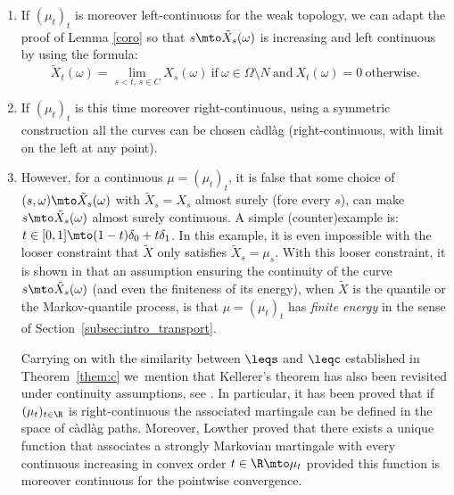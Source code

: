 \skpt
\begin{rem}
\begin{enumerate}
\item
If $(\mu_t)_t$ is moreover left-continuous for the weak topology, we can adapt the proof of Lemma \ref{coro} so that $s\mto \tilde X_s(\omega)$ is increasing and left continuous by using the formula:\vspace*{-3pt}
\[\tilde X_t(\omega)=\lim_{s<t,\,s\in C}X_s(\omega)\ \text{if}\ \omega \in \Omega\setminus N\ \text{and}\ X_t(\omega)=0\ \text{otherwise}.\]

\item
If $(\mu_t)_t$ is this time moreover right-continuous, using a symmetric construction all the curves can be chosen càdlàg (right-continuous, with limit on the left at any point).

\item
However, for a continuous $\mu=(\mu_t)_t$, it is false that some choice of $(s,\omega)\mto \tilde X_s(\omega)$ with $\tilde X_s=X_s$ almost surely (fore every $s$), can make $s\mto \tilde X_s(\omega)$ almost surely continuous. A simple (counter)example is: $t\in [0,1]\mto (1-t)\delta_0+t \delta_1$. In this example, it is even impossible with the looser constraint that $\tilde X$ only satisfies $\tilde X_s=\mu_s$. With this looser constraint, it is shown in \cite{BouJui2} that an assumption ensuring the continuity of the curve $s\mto \tilde X_s(\omega)$ (and even the finiteness of its energy), when $\tilde X$ is the quantile or the Markov-quantile process, is that $\mu=(\mu_t)_t$ has \emph{finite energy} in the sense of Section~\ref{subsec:intro_transport}.

Carrying on with the similarity between $\leqs$ and $\leqc$ established in Theorem~\ref{them:c} we~mention that Kellerer's theorem has also been revisited under continuity assumptions, see \cite{Low,HiRoYo14,BHS}. In particular, it has been proved that if $(\mu_t)_{t\in \R}$ is right-continuous the associated martingale can be defined in the space of càdlàg paths. Moreover, Lowther proved \cite[Th.\,1.5]{Low2} that there exists a unique function that associates a strongly Markovian martingale with every continuous increasing in convex order $t\in \R\mto \mu_t$ provided this function is moreover continuous for the pointwise convergence.
\end{enumerate}
\end{rem}

\label{subsec:proof_lemmas}

